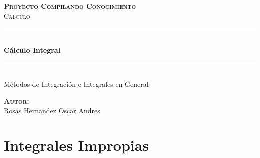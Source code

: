 \documentclass[12pt]{report}                                %
\author{Oscar Andrés Rosas}                                 %
\begin{document}
\begin{titlepage}

    \center
    \textbf{\textsc{\Large Proyecto Compilando Conocimiento}}\\[1.0cm] 
    \textsc{\Large Calculo}\\[1.0cm] 

    \rule{\linewidth}{0.5mm} \\[1.0cm]
        { \huge \bfseries Cálculo Integral}\\[1.0cm] 
    \rule{\linewidth}{0.5mm} \\[2.0cm]
    
    {\LARGE Métodos de Integración e Integrales en General}\\[7cm] 
    
    \begin{center} \large
    \textbf{\textsc{Autor:}}\\
    Rosas Hernandez Oscar Andres
    \end{center}

    \vfill

\end{titlepage}

\tableofcontents{}
\clearpage




\chapter{Integrales Impropias}
    \clearpage

\end{document}

